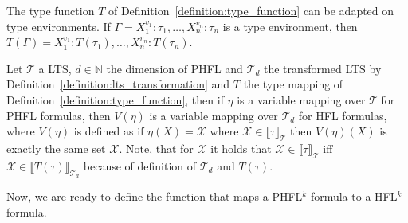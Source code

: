 The type function $T$ of Definition~\ref{definition:type_function} can be adapted on type environments. If
$\Gamma = X_1^{v_1} \colon \tau_1, \dots, X_n^{v_n} \colon \tau_n$ is a type environment, then $T(\Gamma) =
X_1^{v_1} \colon T(\tau_1), \dots, X_n^{v_n} \colon T(\tau_n)$.

\begin{definition}
    \label{definition:variable_mapping_function}
    Let $\mathcal{T}$ a LTS, $d \in \mathbb{N}$ the dimension of PHFL and $\mathcal{T}_d$ the transformed LTS by
    Definition~\ref{definition:lts_transformation} and $T$ the type mapping of
    Definition~\ref{definition:type_function}, then if $\eta$ is a variable mapping over $\mathcal{T}$ for PHFL
    formulas, then $V(\eta)$ is a variable mapping over $\mathcal{T}_d$ for HFL formulas, where $V(\eta)$ is defined
    as if $\eta(X) = \mathcal{X}$ where $\mathcal{X} \in \llbracket \tau \rrbracket_\mathcal{T}$ then $V(\eta)(X)$ is
    exactly the same set $\mathcal{X}$. Note, that for $\mathcal{X}$ it holds that $\mathcal{X} \in \llbracket \tau
    \rrbracket_\mathcal{T}$ iff $\mathcal{X} \in \llbracket T(\tau)\rrbracket_{\mathcal{T}_d}$ because of definition
    of $\mathcal{T}_d$ and $T(\tau)$.
\end{definition}

Now, we are ready to define the function that maps a PHFL$^k$ formula to a HFL$^k$ formula.

